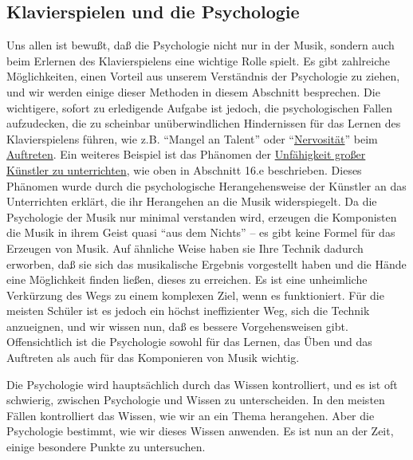 
\subsection{Klavierspielen und die Psychologie}
\label{c1iii21}

Uns allen ist bewußt, daß die Psychologie nicht nur in der Musik, sondern auch beim Erlernen des Klavierspielens eine wichtige Rolle spielt.
Es gibt zahlreiche Möglichkeiten, einen Vorteil aus unserem Verständnis der Psychologie zu ziehen, und wir werden einige dieser Methoden in diesem Abschnitt besprechen.
Die wichtigere, sofort zu erledigende Aufgabe ist jedoch, die psychologischen Fallen aufzudecken, die zu scheinbar unüberwindlichen Hindernissen für das Lernen des Klavierspielens führen, wie z.B. \enquote{Mangel an Talent} oder \enquote{\hyperref[c1iii15]{Nervosität}} beim \hyperref[c1iii14]{Auftreten}.
Ein weiteres Beispiel ist das Phänomen der \hyperref[c1iii16e]{Unfähigkeit großer Künstler zu unterrichten}, wie oben in Abschnitt 16.e beschrieben.
Dieses Phänomen wurde durch die psychologische Herangehensweise der Künstler an das Unterrichten erklärt, die ihr Herangehen an die Musik widerspiegelt.
Da die Psychologie der Musik nur minimal verstanden wird, erzeugen die Komponisten die Musik in ihrem Geist quasi \enquote{aus dem Nichts} -- es gibt keine Formel für das Erzeugen von Musik.
Auf ähnliche Weise haben sie Ihre Technik dadurch erworben, daß sie sich das musikalische Ergebnis vorgestellt haben und  die Hände eine Möglichkeit finden ließen, dieses zu erreichen.
Es ist eine unheimliche Verkürzung des Wegs zu einem komplexen Ziel, wenn es funktioniert.
Für die meisten Schüler ist es jedoch ein höchst ineffizienter Weg, sich die Technik anzueignen, und wir wissen nun, daß es bessere Vorgehensweisen gibt.
Offensichtlich ist die Psychologie sowohl für das Lernen, das Üben und das Auftreten als auch für das Komponieren von Musik wichtig.

Die Psychologie wird hauptsächlich durch das Wissen kontrolliert, und es ist oft schwierig, zwischen Psychologie und Wissen zu unterscheiden.
In den meisten Fällen kontrolliert das Wissen, wie wir an ein Thema herangehen.
Aber die Psychologie bestimmt, wie wir dieses Wissen anwenden.
Es ist nun an der Zeit, einige besondere Punkte zu untersuchen.

